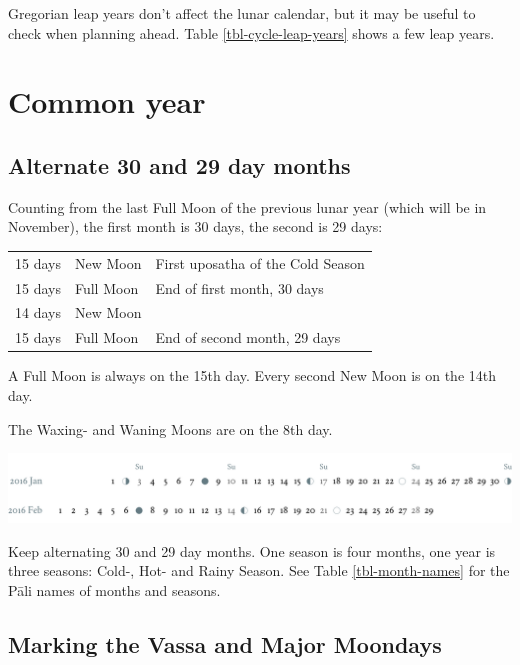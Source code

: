 \documentclass[11pt,oneside]{memoir-article}
\begin{document}
Gregorian leap years don't affect the lunar calendar, but it may be useful to
check when planning ahead. Table \ref{tbl-cycle-leap-years} shows a few leap
years.

\section{Common year}
\label{sec-1-2}
\label{common-year}
\subsection{Alternate 30 and 29 day months}
\label{sec-1-2-1}

Counting from the last Full Moon of the previous lunar year (which will be in
November), the first month is 30 days, the second is 29 days:

\begin{center}
\begin{tabular}{lll}
15 days & \GaNewmoon{} New Moon & First uposatha of the Cold Season\\
15 days & \GaFullmoon{} Full Moon & End of first month, 30 days\\
14 days & \GaNewmoon{} New Moon & \\
15 days & \GaFullmoon{} Full Moon & End of second month, 29 days\\
\end{tabular}
\end{center}

A Full Moon is always on the 15th day. Every second New Moon is on the 14th day.

The \GaWaxingmoon{} Waxing- and \GaWaningmoon{} Waning Moons are on the 8th day.

\includegraphics[width=\linewidth]{two-months.pdf}

Keep alternating 30 and 29 day months. One season is four months, one year is
three seasons: Cold-, Hot- and Rainy Season. See Table \ref{tbl-month-names} for
the Pāli names of months and seasons.

\subsection{Marking the Vassa and Major Moondays}
\label{sec-1-2-2}
\end{document}

